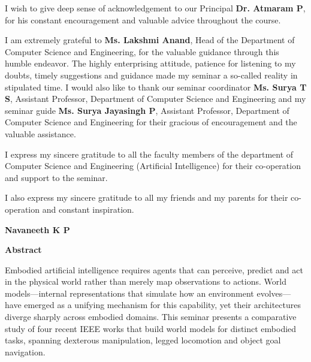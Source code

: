 \documentclass[12pt,a4paper,final]{extreport}
\begin{document}
I wish to give deep sense of acknowledgement to our Principal \textbf{Dr. Atmaram P}, for his constant encouragement and valuable advice throughout the course.

I am extremely grateful to \textbf{Ms. Lakshmi Anand}, Head of the Department of Computer Science and Engineering, for the valuable guidance through this humble endeavor. The highly enterprising attitude, patience for listening to my doubts, timely suggestions and guidance made my seminar a so-called reality in stipulated time.
I would also like to thank our seminar coordinator \textbf{Ms. Surya T S}, Assistant Professor, Department of Computer Science and Engineering and my seminar guide \textbf{Ms. Surya Jayasingh P}, Assistant Professor, Department of Computer Science and Engineering for their gracious of encouragement and the valuable assistance.

I express my sincere gratitude to all the faculty members of the department of Computer Science and Engineering (Artificial Intelligence) for their co-operation and support to the seminar.

I also express my sincere gratitude to all my friends and my parents for their co-operation and constant inspiration.

\vspace{2cm}
\noindent\hfill
\begin{minipage}[t]{0.4\textwidth}
\centering
\textbf{Navaneeth K P}
\end{minipage}

\newpage

\begin{center}
\begin{huge}
\textbf{Abstract}
\end{huge}
\end{center}

\vskip0.3cm

\begingroup
{}
Embodied artificial intelligence requires agents that can perceive, predict and act in the physical world rather than merely map observations to actions. World models---internal representations that simulate how an environment evolves---have emerged as a unifying mechanism for this capability, yet their architectures diverge sharply across embodied domains. This seminar presents a comparative study of four recent IEEE works that build world models for distinct embodied tasks, spanning dexterous manipulation, legged locomotion and object goal navigation.
\end{document}

